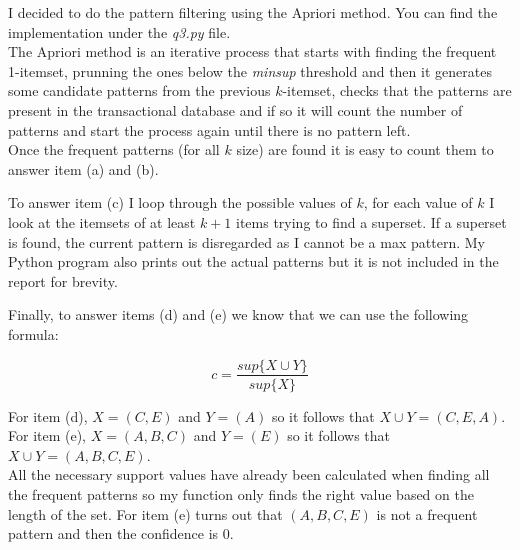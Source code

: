 \documentclass[11pt]{article}
\begin{document}
I decided to do the pattern filtering using the Apriori method. You can find the implementation under the \textit{q3.py} file. \\
The Apriori method is an iterative process that starts with finding the frequent 1-itemset, prunning the ones below the \textit{minsup} threshold and then it generates some candidate patterns from the previous $k$-itemset, checks that the patterns are present in the transactional database and if so it will count the number of patterns and start the process again until there is no pattern left.\\

Once the frequent patterns (for all $k$ size) are found it is easy to count them to answer item (a) and (b). 

To answer item (c) I loop through the possible values of $k$, for each value of $k$ I look at the itemsets of at least $k + 1$ items trying to find a superset. If a superset is found, the current pattern is disregarded as I cannot be a max pattern. My Python program also prints out the actual patterns but it is not included in the report for brevity. 

Finally, to answer items (d) and (e) we know that we can use the following formula:

\[ c =  \frac{sup\{ X \cup Y \} }{sup\{ X \}} \]

For item (d), $X = (C, E)$ and $Y = (A)$ so it follows that $X \cup Y = (C, E, A)$.\\
For item (e), $X = (A, B, C)$ and $Y = (E)$ so it follows that $X \cup Y = (A, B, C, E)$.\\

All the necessary support values have already been calculated when finding all the frequent patterns so my function only finds the right value based on the length of the set. For item (e) turns out that $(A, B, C, E)$ is not a frequent pattern and then the confidence is 0.
\end{document}

